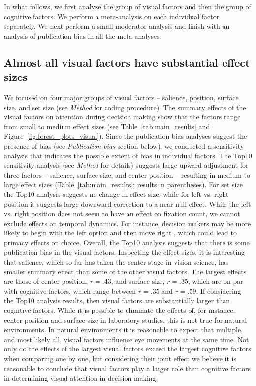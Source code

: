 In what follows, we first analyze the group of visual factors and then the group of cognitive factors. We perform a meta-analysis on each individual factor  separately. We next perform a small moderator analysis and finish with an analysis of publication bias in all the meta-analyses.


\subsection{Almost all visual factors have substantial effect sizes}

We focused on four major groups of visual factors -- salience, position, surface size, and set size (see \textit{Method} for coding procedure). The summary effects of the visual factors on attention during decision making show that the factors range from small to medium effect sizes (see Table~\ref{tab:main_results} and Figure~\ref{fig:forest_plots_visual}). Since the publication bias analyses suggest the presence of bias (see \textit{Publication bias} section below), we conducted a sensitivity analysis that indicates the possible extent of bias in individual factors. The Top10 sensitivity analysis (see \textit{Method} for details) suggests large upward adjustment for three factors -- salience, surface size, and center position -- resulting in medium to large effect sizes (Table~\ref{tab:main_results}; results in parentheses). For set size the Top10 analysis suggests no change in effect size, while for left vs. right position it suggests large downward correction to a near null effect. While the left vs. right position does not seem to have an effect on fixation count, we cannot exclude effects on temporal dynamics. For instance, decision makers may be more likely to begin with the left option and then move right \citep{fiedler2012}, which could lead to primacy effects on choice. Overall, the Top10 analysis suggests that there is some publication bias in the visual factors. Inspecting the effect sizes, it is interesting that salience, which so far has taken the center stage in vision science, has smaller summary effect than some of the other visual factors. The largest effects are those of center position, $r=.43$, and surface size, $r=.35$, which are on par with cognitive factors, which range between $r = .35$ and $r = .59$. If considering the Top10 analysis results, then visual factors are substantially larger than cognitive factors. While it is possible to eliminate the effects of, for instance, center position and surface size in laboratory studies, this is not true for natural environments. In natural environments it is reasonable to expect that multiple, and most likely all, visual factors influence eye movements at the same time. Not only do the effects of the largest visual factors exceed the largest cognitive factors when comparing one by one, but considering their joint effect we believe it is reasonable to conclude that visual factors play a larger role than cognitive factors in determining visual attention in decision making. 


